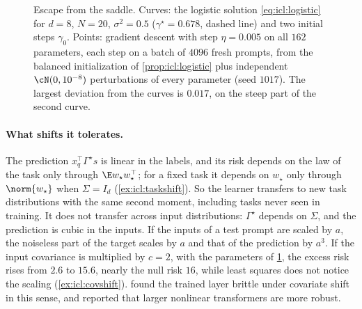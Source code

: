 \begin{refsection}
\begin{figure}[t]
\centering
{}
\caption{Escape from the saddle. Curves: the logistic solution \eqref{eq:icl:logistic} for $d=8$, $N=20$, $\sigma^2=0.5$ ($\gamma^\star=0.678$, dashed line) and two initial steps $\gamma_0$. Points: gradient descent with step $\eta=0.005$ on all $162$ parameters, each step on a batch of $4096$ fresh prompts, from the balanced initialization of \cref{prop:icl:logistic} plus independent $\cN(0,10^{-8})$ perturbations of every parameter (seed $1017$). The largest deviation from the curves is $0.017$, on the steep part of the second curve.}
\label{fig:icl:dynamics}
\end{figure}

\paragraph{What shifts it tolerates.} The prediction $x_q^\top\Gamma^\star s$ is linear in the labels, and its risk depends on the law of the task only through $\E w_\star w_\star^\top$; for a fixed task it depends on $w_\star$ only through $\norm{w_\star}$ when $\Sigma=I_d$ (\cref{ex:icl:taskshift}). So the learner transfers to new task distributions with the same second moment, including tasks never seen in training. It does not transfer across input distributions: $\Gamma^\star$ depends on $\Sigma$, and the prediction is cubic in the inputs. If the inputs of a test prompt are scaled by $a$, the noiseless part of the target scales by $a$ and that of the prediction by $a^3$. If the input covariance is multiplied by $c=2$, with the parameters of \cref{fig:icl:dynamics}, the excess risk rises from $2.6$ to $15.6$, nearly the null risk $16$, while least squares does not notice the scaling (\cref{ex:icl:covshift}). \Textcite{ZhangFreiBartlett2024} found the trained layer brittle under covariate shift in this sense, and reported that larger nonlinear transformers are more robust.


\end{refsection}
